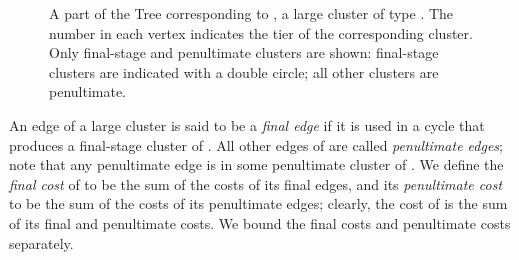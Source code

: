 \documentclass[11pt]{article}
\begin{document}
\begin{figure}[tbh]
  \begin{center}
  \end{center}
  \caption{A part of the Tree  corresponding to , a large
    cluster of type . The number in each vertex indicates the tier
    of the corresponding cluster.  Only final-stage and penultimate
    clusters are shown: final-stage clusters are indicated with a
    double circle; all other clusters are penultimate.}
\end{figure}

An edge of a large cluster  is said to be a \emph{final edge} if it
is used in a cycle  that produces a final-stage cluster of . All
other edges of  are called \emph{penultimate edges}; note that any
penultimate edge is in some penultimate cluster of . We define the
\emph{final cost} of  to be the sum of the costs of its final
edges, and its \emph{penultimate cost} to be the sum of the costs of
its penultimate edges; clearly, the cost of  is the sum of its
final and penultimate costs. We bound the final costs and penultimate
costs separately.
\end{document}
